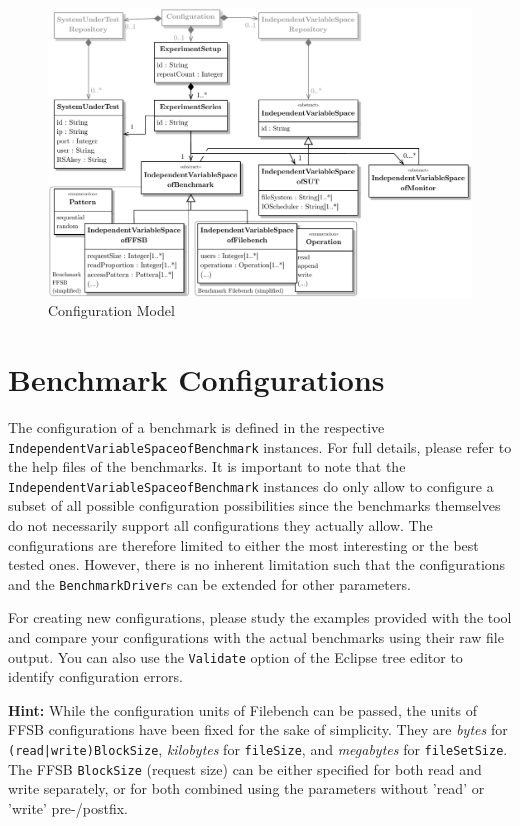 \begin{figure}[htbp]
    \centering
    \includegraphics[scale=0.55]{graphics/DataModel.pdf}
    \caption{Configuration Model}
    \label{fig:DataModel}
\end{figure}

\section{Benchmark Configurations}

The configuration of a benchmark is defined in the respective \texttt{IndependentVariableSpaceofBenchmark} instances. For full details, please refer to the help files of the benchmarks. It is important to note that the \texttt{IndependentVariableSpaceofBenchmark} instances do only allow to configure a subset of all possible configuration possibilities since the benchmarks themselves do not necessarily support all configurations they actually allow. The configurations are therefore limited to either the most interesting or the best tested ones. However, there is no inherent limitation such that the configurations and the \texttt{BenchmarkDriver}s can be extended for other parameters.

For creating new configurations, please study the examples provided with the tool and compare your configurations with the actual benchmarks using their raw file output. You can also use the \texttt{Validate} option of the Eclipse tree editor to identify configuration errors. 

\textbf{Hint:} While the configuration units of Filebench can be passed, the units of FFSB configurations have been fixed for the sake of simplicity. They are \textit{bytes} for \texttt{(read|write)BlockSize}, \textit{kilobytes} for \texttt{fileSize}, and \textit{megabytes} for \texttt{fileSetSize}. The FFSB \texttt{BlockSize} (request size) can be either specified for both read and write separately, or for both combined using the parameters without 'read' or 'write' pre-/postfix.  
  

